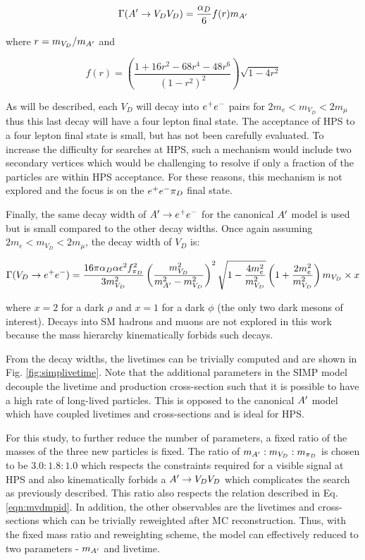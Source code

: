 \begin{equation}
    \Gamma (A^\prime \rightarrow V_D V_D)  = \frac{\alpha_D}{6} f(r) m_{A^\prime}
    \label{eqn:VV}
\end{equation}

where $r=m_{V_D}/m_{A^\prime}$ and

\begin{equation}
    f(r) = \left( \frac{1+16r^2-68r^4-48r^6}{(1-r^2)^2} \right) \sqrt{1-4r^2}
    \label{eqn:fr}
\end{equation}

As will be described, each $V_D$ will decay into $e^{+}e^{-}$ pairs for $2m_e<m_{V_D}<2m_{\mu}$ thus this last decay will have a four lepton final state. The acceptance of HPS to a four lepton final state is small, but has not been carefully evaluated. To increase the difficulty for searches at HPS, such a mechanism would include two secondary vertices which would be challenging to resolve if only a fraction of the particles are within HPS acceptance. For these reasons, this mechanism is not explored and the focus is on the $e^{+}e^{-} \pi_D$ final state.

Finally, the same decay width of $A^\prime \rightarrow e^{+}e^{-}$ for the canonical $A^\prime$ model is used but is small compared to the other decay widths. Once again assuming $2m_e<m_{V_D}<2m_{\mu}$, the decay width of $V_D$ is:

\begin{equation}
    \Gamma(V_D \rightarrow e^{+}e^{-}) = \frac{16 \pi \alpha_D \alpha \epsilon^2 f^2_{\pi_D}}{3m^2_{V_D}} \left( \frac{m^2_{V_D}}{m^2_{A^\prime}-m^2_{V_D}} \right)^2 \sqrt{1-\frac{4m_e^2}{m^2_{V_D}}} \left( 1+ \frac{2m_e^2}{m^2_{V_D}}\right) m_{V_D} \times x
    \label{eqn:vdecay}
\end{equation}

where $x = 2$ for a dark $\rho$ and $x= 1$ for a dark $\phi$ (the only two dark mesons of interest). Decays into SM hadrons and muons are not explored in this work because the mass hierarchy kinematically forbids such decays.

From the decay widths, the livetimes can be trivially computed and are shown in Fig. \ref{fig:simplivetime}. Note that the additional parameters in the SIMP model decouple the livetime and production cross-section such that it is possible to have a high rate of long-lived particles. This is opposed to the canonical $A^\prime$ model which have coupled livetimes and cross-sections and is ideal for HPS.

For this study, to further reduce the number of parameters, a fixed ratio of the masses of the three new particles is fixed. The ratio of $m_{A^\prime}:m_{V_D}:m_{\pi_D}$ is chosen to be $3.0:1.8:1.0$ which respects the constraints required for a visible signal at HPS and also kinematically forbids a $A^\prime \rightarrow V_D V_D$ which complicates the search as previously described. This ratio also respects the relation described in Eq. \ref{eqn:mvdmpid}. In addition, the other observables are the livetimes and cross-sections which can be trivially reweighted after MC reconstruction. Thus, with the fixed mass ratio and reweighting scheme, the model can effectively reduced to two parameters - $m_{A^\prime}$ and livetime.

